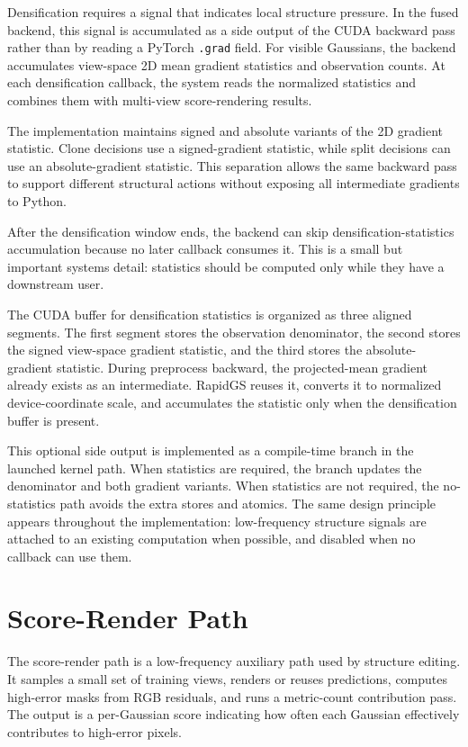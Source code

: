 Densification requires a signal that indicates local structure pressure. In the fused backend, this signal is accumulated as a side output of the CUDA backward pass rather than by reading a PyTorch \texttt{.grad} field. For visible Gaussians, the backend accumulates view-space 2D mean gradient statistics and observation counts. At each densification callback, the system reads the normalized statistics and combines them with multi-view score-rendering results.

The implementation maintains signed and absolute variants of the 2D gradient statistic. Clone decisions use a signed-gradient statistic, while split decisions can use an absolute-gradient statistic. This separation allows the same backward pass to support different structural actions without exposing all intermediate gradients to Python.

After the densification window ends, the backend can skip densification-statistics accumulation because no later callback consumes it. This is a small but important systems detail: statistics should be computed only while they have a downstream user.

The CUDA buffer for densification statistics is organized as three aligned segments. The first segment stores the observation denominator, the second stores the signed view-space gradient statistic, and the third stores the absolute-gradient statistic. During preprocess backward, the projected-mean gradient already exists as an intermediate. RapidGS reuses it, converts it to normalized device-coordinate scale, and accumulates the statistic only when the densification buffer is present.

This optional side output is implemented as a compile-time branch in the launched kernel path. When statistics are required, the branch updates the denominator and both gradient variants. When statistics are not required, the no-statistics path avoids the extra stores and atomics. The same design principle appears throughout the implementation: low-frequency structure signals are attached to an existing computation when possible, and disabled when no callback can use them.

\section{Score-Render Path}

The score-render path is a low-frequency auxiliary path used by structure editing. It samples a small set of training views, renders or reuses predictions, computes high-error masks from RGB residuals, and runs a metric-count contribution pass. The output is a per-Gaussian score indicating how often each Gaussian effectively contributes to high-error pixels.

